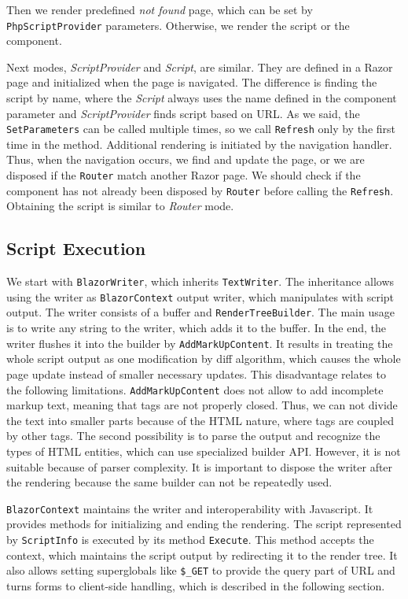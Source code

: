Then we render predefined \textit{not found} page, which can be set by \texttt{PhpScriptProvider} parameters.
Otherwise, we render the script or the component.
\par
Next modes, \textit{ScriptProvider} and \textit{Script}, are similar.
They are defined in a Razor page and initialized when the page is navigated.  
The difference is finding the script by name, where the \textit{Script} always uses the name defined in the component parameter and \textit{ScriptProvider} finds script based on URL.
As we said, the \texttt{SetParameters} can be called multiple times, so we call \texttt{Refresh} only by the first time in the method.
Additional rendering is initiated by the navigation handler.
Thus, when the navigation occurs, we find and update the page, or we are disposed if the \texttt{Router} match another Razor page. 
We should check if the component has not already been disposed by \texttt{Router} before calling the \texttt{Refresh}.
Obtaining the script is similar to \textit{Router} mode.

\subsection{Script Execution}
We start with \texttt{BlazorWriter}, which inherits \texttt{TextWriter}.
The inheritance allows using the writer as \texttt{BlazorContext} output writer, which manipulates with script output.
The writer consists of a buffer and \texttt{RenderTreeBuilder}.
The main usage is to write any string to the writer, which adds it to the buffer.
In the end, the writer flushes it into the builder by \texttt{AddMarkUpContent}.
It results in treating the whole script output as one modification by diff algorithm, which causes the whole page update instead of smaller necessary updates.
This disadvantage relates to the following limitations.
\texttt{AddMarkUpContent} does not allow to add incomplete markup text, meaning that tags are not properly closed.
Thus, we can not divide the text into smaller parts because of the HTML nature, where tags are coupled by other tags.
The second possibility is to parse the output and recognize the types of HTML entities, which can use specialized builder API.
However, it is not suitable because of parser complexity.
It is important to dispose the writer after the rendering because the same builder can not be repeatedly used.
\par
\texttt{BlazorContext} maintains the writer and interoperability with Javascript.
It provides methods for initializing and ending the rendering.
The script represented by \texttt{ScriptInfo} is executed by its method \texttt{Execute}. This method accepts the context, which maintains the script output by redirecting it to the render tree.
It also allows setting superglobals like \texttt{\$\_GET} to provide the query part of URL and turns forms to client-side 
handling, which is described in the following section.

